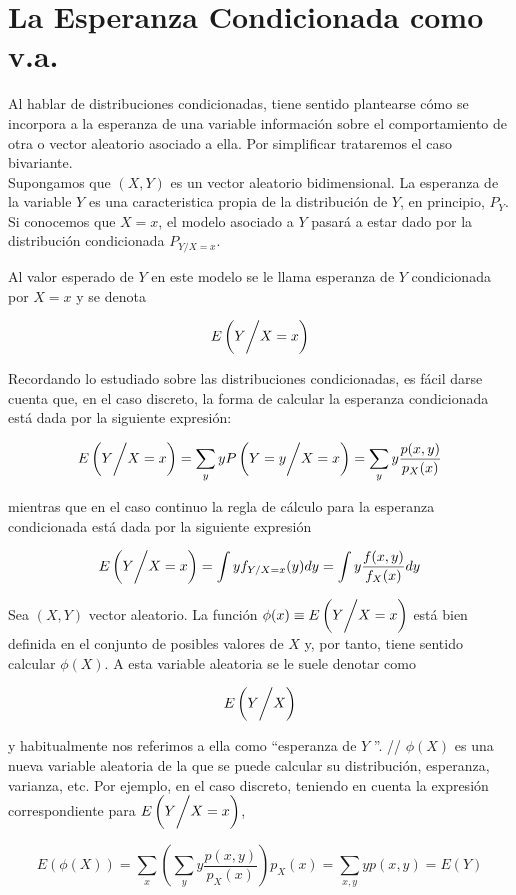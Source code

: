 \section{La Esperanza Condicionada como v.a.}


Al hablar de distribuciones condicionadas, tiene sentido plantearse cómo se incorpora a la esperanza de una variable información sobre el comportamiento de otra
o vector aleatorio asociado a ella. Por simplificar trataremos el caso bivariante. \\
Supongamos que $(X,Y)$ es un vector aleatorio bidimensional. La esperanza de la variable $Y$ es una caracteristica propia de la distribución de $Y$, en principio, $P_Y$.
Si conocemos que $X = x$, el modelo asociado a $Y$ pasará a estar dado por la distribución condicionada $P_{Y/X = x}$.

\newpage

Al valor esperado de $Y$ en este modelo se le llama esperanza de $Y$ condicionada por $X=x$ y se denota

\[ E\left( Y \bigg{/} X = x \right) \]

Recordando lo estudiado sobre las distribuciones condicionadas, es fácil darse cuenta que, en el caso discreto, la forma de calcular la esperanza condicionada
está dada por la siguiente expresión:

\[ E\left( Y \bigg{/} X = x \right) = \sum_yyP\left(Y=y\bigg{/X=x}\right) = \sum_yy\frac{p(x,y)}{p_X(x)} \]

mientras que en el caso continuo la regla de cálculo para la esperanza condicionada está dada por la siguiente expresión

\[ E\left( Y \bigg{/} X = x \right) = \int yf_{Y/X=x}(y)dy = \int y\frac{f(x,y)}{f_X(x)}dy \]

Sea $(X,Y)$ vector aleatorio. La función $\phi(x) \equiv E\left( Y \bigg{/} X = x \right)$ está bien definida en el conjunto de posibles valores de $X$ y, por tanto,
tiene sentido calcular $\phi(X)$. A esta variable aleatoria se le suele denotar como

\[ E\left( Y \bigg{/} X \right) \]

y habitualmente nos referimos a ella como ``esperanza de $Y$ ''. //
$\phi(X)$ es una nueva variable aleatoria de la que se puede calcular su distribución, esperanza, varianza, etc. Por ejemplo, en el caso discreto, teniendo en cuenta
la expresión correspondiente para $E\left( Y \bigg{/} X = x \right)$,

\[ E(\phi(X)) = \sum_x \left( \sum_y y\frac{p(x,y)}{p_X(x)} \right) p_X(x) = \sum_{x,y}yp(x,y) = E(Y) \]


